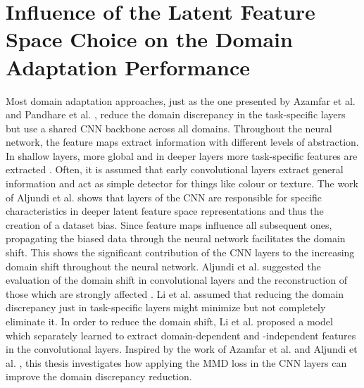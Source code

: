 \section{Influence of the Latent Feature Space Choice on the Domain Adaptation Performance}
Most domain adaptation approaches, just as the one presented by Azamfar et al. \cite{AZAMFAR2020103932} and Pandhare et al. \cite{Pandhare2021}, reduce the domain discrepancy in the task-specific layers but use a shared CNN backbone across all domains. Throughout the neural network, the feature maps extract information with different levels of abstraction. In shallow layers, more global and in deeper layers more task-specific features are extracted \cite{Aljundi2016}. Often, it is assumed that early convolutional layers extract general information and act as simple detector for things like colour or texture. The work of Aljundi et al. \cite{Aljundi2016} shows that layers of the CNN are responsible for specific characteristics in deeper latent feature space representations and thus the creation of a dataset bias. Since feature maps influence all subsequent ones, propagating the biased data through the neural network facilitates the domain shift. This shows the significant contribution of the CNN layers to the increasing domain shift throughout the neural network. Aljundi et al. \cite{Aljundi2016} suggested the evaluation of the domain shift in convolutional layers and the reconstruction of those which are strongly affected \cite{Aljundi2016}. Li et al. \cite{li2020} assumed that reducing the domain discrepancy just in task-specific layers might minimize but not completely eliminate it. In order to reduce the domain shift, Li et al. \cite{li2020} proposed a model which separately learned to extract domain-dependent and -independent features in the convolutional layers. Inspired by the work of Azamfar et al. \cite{Aljundi2016} and Aljundi et al. \cite{Aljundi2016}, this thesis investigates how applying the MMD loss in the CNN layers can improve the domain discrepancy reduction.

